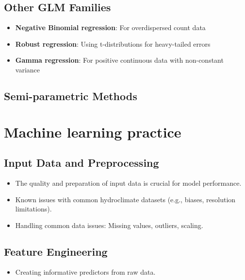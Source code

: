 \documentclass[
  letterpaper,
  DIV=11,
  numbers=noendperiod]{scrreprt}
\providecommand{\tightlist}{%
  \setlength{\itemsep}{0pt}\setlength{\parskip}{0pt}}
\begin{document}
\subsection{Other GLM Families}\label{other-glm-families}

\begin{itemize}
\tightlist
\item
  \textbf{Negative Binomial regression}: For overdispersed count data
\item
  \textbf{Robust regression}: Using t-distributions for heavy-tailed
  errors
\item
  \textbf{Gamma regression}: For positive continuous data with
  non-constant variance
\end{itemize}

\subsection{Semi-parametric Methods}\label{semi-parametric-methods-1}

\section{Machine learning practice}\label{machine-learning-practice}

\subsection{Input Data and
Preprocessing}\label{input-data-and-preprocessing}

\begin{itemize}
\tightlist
\item
  The quality and preparation of input data is crucial for model
  performance.
\item
  Known issues with common hydroclimate datasets (e.g., biases,
  resolution limitations).
\item
  Handling common data issues: Missing values, outliers, scaling.
\end{itemize}

\subsection{Feature Engineering}\label{feature-engineering}

\begin{itemize}
\tightlist
\item
  Creating informative predictors from raw data.
\end{itemize}
\end{document}
